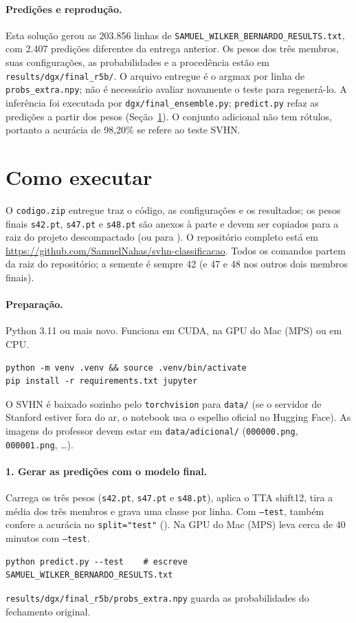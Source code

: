 \documentclass[11pt,a4paper]{article}
\begin{document}
{\sloppy
\paragraph{Predições e reprodução.} Esta solução gerou as 203.856 linhas de
\texttt{SAMUEL\_WILKER\_BERNARDO\_\allowbreak RESULTS.txt}, com 2.407 predições diferentes da entrega anterior.
Os pesos dos três membros, suas configurações, as probabilidades e a procedência estão em
\texttt{results/dgx/final\_r5b/}. O arquivo entregue é o argmax por linha de \texttt{probs\_extra.npy};
não é necessário avaliar novamente o teste para regenerá-lo. A inferência foi executada por
\texttt{dgx/final\_ensemble.py}; \texttt{predict.py} refaz as predições a partir dos pesos (Seção~\ref{sec:rodar}). O conjunto adicional não tem rótulos,
portanto a acurácia de 98,20\% se refere ao teste SVHN.
\par}

\section{Como executar}\label{sec:rodar}

O \texttt{codigo.zip} entregue traz o código, as configurações e os resultados; os pesos finais \texttt{s42.pt}, \texttt{s47.pt} e \texttt{s48.pt} são anexos à parte e devem ser copiados para a raiz do projeto descompactado (ou para ). O repositório completo está em \url{https://github.com/SamuelNahas/svhn-classificacao}. Todos os comandos partem da raiz do
repositório; a semente é sempre 42 (e 47 e 48 nos outros dois membros finais).

\paragraph{Preparação.} Python 3.11 ou mais novo. Funciona em CUDA, na GPU do Mac (MPS) ou em CPU.
\begin{verbatim}
python -m venv .venv && source .venv/bin/activate
pip install -r requirements.txt jupyter
\end{verbatim}
O SVHN é baixado sozinho pelo \texttt{torchvision} para \texttt{data/} (se o servidor de Stanford estiver fora
do ar, o notebook usa o espelho oficial no Hugging Face). As imagens do professor devem estar em
\texttt{data/adicional/} (\texttt{000000.png}, \texttt{000001.png}, \ldots).

\paragraph{1. Gerar as predições com o modelo final.} Carrega os três pesos
(\texttt{s42.pt}, \texttt{s47.pt} e \texttt{s48.pt}), aplica o TTA shift12, tira a média dos três membros e grava uma
classe por linha. Com \texttt{--test}, também confere a acurácia no \texttt{split="test"} (\testeFinal{}). Na GPU do Mac (MPS) leva cerca de 40 minutos com \texttt{--test}.
\begin{verbatim}
python predict.py --test    # escreve SAMUEL_WILKER_BERNARDO_RESULTS.txt
\end{verbatim}
\texttt{results/dgx/final\_r5b/probs\_extra.npy} guarda as probabilidades do fechamento original.
\end{document}
